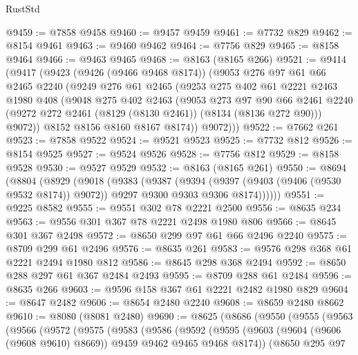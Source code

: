 \begin{lexlean}{RustStd}
\begin{coremodule}
{\begin{coremodule}
{{{{{{{{{{{{{{{{{{{{{{{{{{{{{{{{{{{{{{{{{{{{{{{{{{{{{@9459 := @7858 @9458
@9460 := @9457 @9459
@9461 := @7732 @829
@9462 := @8154 @9461
@9463 := @9460 @9462
@9464 := @7756 @829
@9465 := @8158 @9464
@9466 := @9463 @9465
@9468 := @8163 (@8165 @266)
@9521 := @9414
    (@9417
      (@9423
        (@9426 (@9466 @9468 @8174))
        (@9053
          @276
          @97
          @61
          @66
          @2465
          @2240
          (@9249
            @276
            @61
            @2465
            (@9253
              @275
              @402
              @61
              @2221
              @2463
              @1980
              @408
              (@9048
                @275
                @402
                @2463
                (@9053
                  @273
                  @97
                  @90
                  @66
                  @2461
                  @2240
                  (@9272 @272 @2461 (@8129 (@8130 @2461)) (@8134 (@8136 @272 @90)))
                  @9072))
              @8152
              @8156
              @8160
              @8167
              @8174))
          @9072)))
@9522 := @7662 @261
@9523 := @7858 @9522
@9524 := @9521 @9523
@9525 := @7732 @812
@9526 := @8154 @9525
@9527 := @9524 @9526
@9528 := @7756 @812
@9529 := @8158 @9528
@9530 := @9527 @9529
@9532 := @8163 (@8165 @261)
@9550 := @8694
    (@8804
      (@8929
        (@9018
          (@9383
            (@9387
              (@9394
                (@9397 (@9403 (@9406 (@9530 @9532 @8174)) @9072))
                @9297
                @9300
                @9303
                @9306
                @8174))))))
@9551 := @9225 @8582
@9555 := @9551 @302 @78 @2221 @2500
@9556 := @8635 @234
@9563 := @9556 @301 @367 @78 @2221 @2498 @1980 @806
@9566 := @8645 @301 @367 @2498
@9572 := @8650 @299 @97 @61 @66 @2496 @2240
@9575 := @8709 @299 @61 @2496
@9576 := @8635 @261
@9583 := @9576 @298 @368 @61 @2221 @2494 @1980 @812
@9586 := @8645 @298 @368 @2494
@9592 := @8650 @288 @297 @61 @367 @2484 @2493
@9595 := @8709 @288 @61 @2484
@9596 := @8635 @266
@9603 := @9596 @158 @367 @61 @2221 @2482 @1980 @829
@9604 := @8647 @2482
@9606 := @8654 @2480 @2240
@9608 := @8659 @2480 @8662
@9610 := @8080 (@8081 @2480)
@9690 := @8625
    (@8686
      (@9550
        (@9555
          (@9563
            (@9566
              (@9572
                (@9575
                  (@9583
                    (@9586
                      (@9592
                        (@9595
                          (@9603 (@9604 (@9606 (@9608 @9610) @8669)) @9459 @9462 @9465 @9468 @8174))
                        (@8650
                          @295
                          @97
}}}}}}}}}}}}}}}}}}}}}}}}}}}}}}}}}}}}}}}}}}}}}}}}}}}}}
\end{coremodule}}
\end{coremodule}
\end{lexlean}
